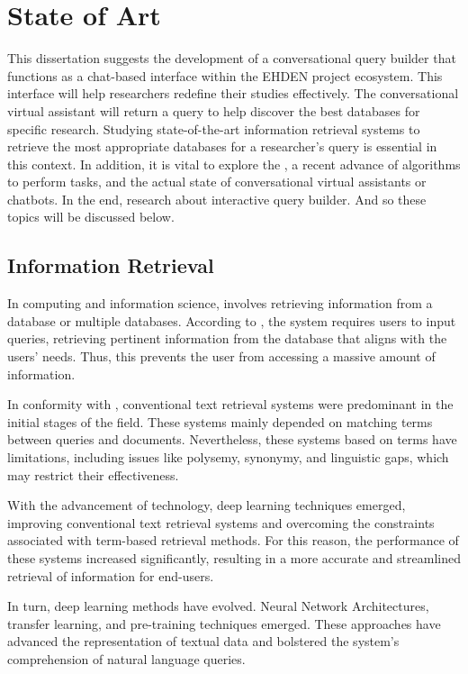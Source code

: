 \chapter{State of Art}
\label{chapter: State of Art}

This dissertation suggests the development of a conversational query builder that functions as a chat-based interface within the EHDEN project ecosystem. This interface will help researchers redefine their studies effectively. The conversational virtual assistant will return a query to help discover the best databases for specific research. Studying state-of-the-art information retrieval systems to retrieve the most appropriate databases for a researcher's query is essential in this context. In addition, it is vital to explore the {\llm}, a recent advance of algorithms to perform {\nlp} tasks, and the actual state of conversational virtual assistants or chatbots. In the end, research about interactive query builder. And so these topics will be discussed below.


\section{Information Retrieval}

In computing and information science, {\ir} involves retrieving information from a database or multiple databases. According to \citet{p_m_efficient_2021}, the {\ir} system requires users to input queries, retrieving pertinent information from the database that aligns with the users' needs. Thus, this prevents the user from accessing a massive amount of information.

In conformity with \citet{hambarde_information_2023}, conventional text retrieval systems were predominant in the initial stages of the {\ir} field. These systems mainly depended on matching terms between queries and documents. Nevertheless, these systems based on terms have limitations, including issues like polysemy, synonymy, and linguistic gaps, which may restrict their effectiveness.

With the advancement of technology, deep learning techniques emerged, improving conventional text retrieval systems and overcoming the constraints associated with term-based retrieval methods. For this reason, the performance of these systems increased significantly, resulting in a more accurate and streamlined retrieval of information for end-users.

In turn, deep learning methods have evolved. Neural Network Architectures, transfer learning, and pre-training techniques emerged. These approaches have advanced the representation of textual data and bolstered the {\ir} system's comprehension of natural language queries.

